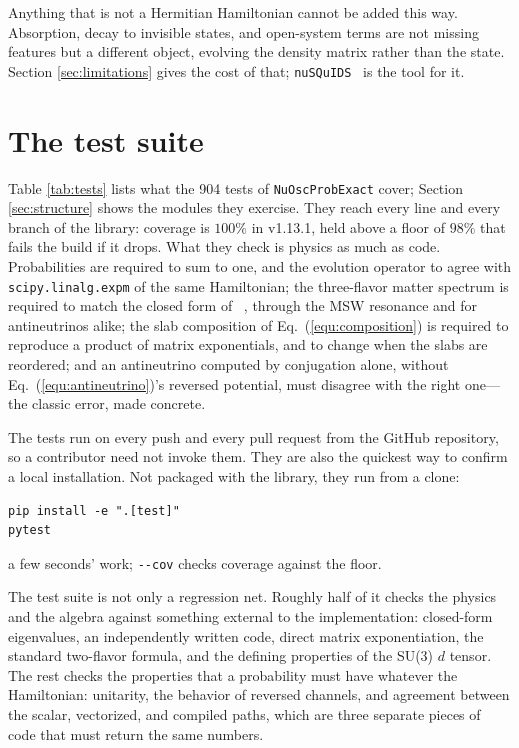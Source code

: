 \documentclass[final,5p,times,twocolumn,sort,compress]{elsarticle}
\newcommand{\eq}{Eq.}
\providecommand{\Ref}{}
\newcommand{\equ}[1]{\eq~(\ref{equ:#1})}
\begin{document}
Anything that is not a Hermitian Hamiltonian cannot be added this way.  Absorption, decay to invisible states, and open-system terms are not missing features but a different object, evolving the density matrix rather than the state.  Section \ref{sec:limitations} gives the cost of that; {\tt nuSQuIDS}\ \cite{Delgado:2014kpa, NuSQuIDS} is the tool for it.



\section{The test suite}
\label{app:tests}
\appresetfloats

Table \ref{tab:tests} lists what the 904 tests of {\tt NuOscProbExact} cover; Section \ref{sec:structure} shows the modules they exercise.  They reach every line and every branch of the library: coverage is $100\%$ in v1.13.1, held above a floor of $98\%$ that fails the build if it drops.  What they check is physics as much as code.  Probabilities are required to sum to one, and the evolution operator to agree with {\tt scipy.linalg.expm} of the same Hamiltonian; the three-flavor matter spectrum is required to match the closed form of \Ref\ \cite{Zaglauer:1988gz}, through the MSW resonance and for antineutrinos alike; the slab composition of \equ{composition} is required to reproduce a product of matrix exponentials, and to change when the slabs are reordered; and an antineutrino computed by conjugation alone, without \equ{antineutrino}'s reversed potential, must disagree with the right one---the classic error, made concrete.

The tests run on every push and every pull request from the GitHub repository, so a contributor need not invoke them.  They are also the quickest way to confirm a local installation.  Not packaged with the library, they run from a clone:
\begin{verbatim}
pip install -e ".[test]"
pytest
\end{verbatim}
a few seconds' work; {\tt -{}-cov} checks coverage against the floor.

The test suite is not only a regression net.  Roughly half of it checks the physics and the algebra against something external to the implementation: closed-form eigenvalues, an independently written code, direct matrix exponentiation, the standard two-flavor formula, and the defining properties of the SU(3) $d$ tensor.  The rest checks the properties that a probability must have whatever the Hamiltonian: unitarity, the behavior of reversed channels, and agreement between the scalar, vectorized, and compiled paths, which are three separate pieces of code that must return the same numbers.
\end{document}
